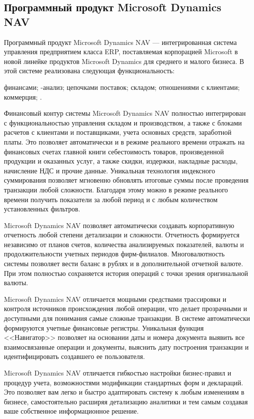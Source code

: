 \documentclass[14pt,a4paper]{reportmod}
\begin{document}
\subsection{Программный продукт Microsoft Dynamics NAV}
Программный продукт Microsoft Dynamics NAV — интегрированная система управления предприятием  класса ERP, поставляемая корпорацией Microsoft в новой линейке продуктов Microsoft Dynamics для среднего и малого бизнеса. В этой системе реализована следующая функциональность:
\begin{itemize}
   финансами;
  -анализ;
   цепочками поставок;
   складом;
   отношениями с клиентами;
   коммерция;
  .
\end{itemize}
Финансовый контур системы Microsoft Dynamics NAV полностью интегрирован с функциональностью управления складом и производством, а также с блоками расчетов с клиентами и поставщиками, учета основных средств, заработной платы. Это позволяет автоматически и в режиме реального времени отражать на финансовых счетах главной книги себестоимость товаров, произведенной продукции и оказанных услуг, а также скидки, издержки, накладные расходы, начисление НДС и прочие данные. Уникальная технология индексного суммирования позволяет мгновенно обновлять итоговые суммы после проведения транзакции любой сложности. Благодаря этому можно в режиме реального времени получить показатели за любой период и с любым количеством установленных фильтров.


Microsoft Dynamics NAV позволяет автоматически создавать корпоративную отчетность любой степени детализации и сложности. Отчетность формируется независимо от планов счетов, количества анализируемых показателей, валюты и продолжительности учетных периодов фирм-филиалов. Многовалютность системы позволяет вести баланс в рублях и в дополнительной отчетной валюте. При этом полностью сохраняется история операций с точки зрения оригинальной валюты.


Microsoft Dynamics NAV отличается мощными средствами трассировки и контроля источников происхождения любой операции, что делает прозрачными и доступными для понимания самые сложные транзакции. В системе автоматически формируются учетные финансовые регистры. Уникальная функция <<Навигатор>> позволяет на основании даты и номера документа выявить все взаимосвязанные операции и документы, выяснить дату построения транзакции и идентифицировать создавшего ее пользователя.


Microsoft Dynamics NAV отличается гибкостью настройки бизнес-правил и процедур учета, возможностями модификации стандартных форм и деклараций. Это позволяет вам легко и быстро адаптировать систему к любым изменениям в бизнесе, самостоятельно расширяя детализацию аналитики и тем самым создавая ваше собственное информационное решение.
\end{document}

